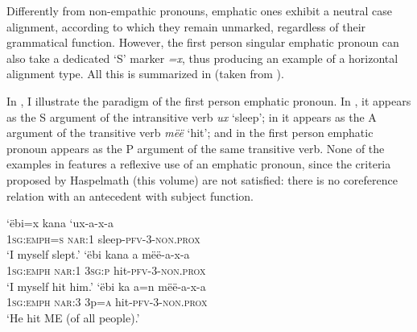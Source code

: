 \documentclass[output=paper,colorlinks,citecolor=brown,modfonts,nonflat]{langscibook}
\begin{document}
Differently from non-empathic pronouns, emphatic ones exhibit a neutral case alignment, according to which they remain unmarked, regardless of their grammatical function. However, the first person singular emphatic pronoun can also take a dedicated ‘S’ marker \textit{=x}, thus producing an example of a horizontal alignment type. All this is summarized in  (taken from \citealt[177]{Zariquiey2018}).

\begin{table}
    \caption{Emphatic personal pronouns in Kakataibo}
    \label{tab:zariquiey:6}
\end{table}

In , I illustrate the paradigm of the first person emphatic pronoun. In , it appears as the S argument of the intransitive verb \textit{ux} ‘sleep’; in  it appears as the A argument of the transitive verb \textit{mëë} ‘hit’; and in  the first person emphatic pronoun appears as the P argument of the same transitive verb. None of the examples in  features a reflexive use of an emphatic pronoun, since the criteria proposed by Haspelmath (this volume) are not satisfied: there is no coreference relation with an antecedent with subject function. 

\ea%
    \label{ex:zariquiey:12}
    \ea%
    \label{ex:zariquiey:12a}
    \gll    ‘ëbi=x kana ‘ux-a-x-a\\
            \textsc{1sg:emph=s}    \textsc{nar:1}    sleep-\textsc{pfv-3-non.prox}\\
    \glt    ‘I myself slept.’
    \ex%
    \label{ex:zariquiey:12b}
    \gll    ‘ëbi    kana  a  mëë-a-x-a\\
            \textsc{1sg:emph}    \textsc{nar:1}  \textsc{3sg:p}  hit-\textsc{pfv-3-non.prox}\\
    \glt    ‘I myself hit him.’
    \ex%
    \label{ex:zariquiey:12c}
    \gll    ‘ëbi    ka  a=n  mëë-a-x-a\\
            \textsc{1sg:emph}    \textsc{nar:3}  3p=\textsc{a}  hit\textsc{{}-pfv-3-non.prox}\\
    \glt    ‘He hit ME (of all people).’
    \z
\z
\end{document}
